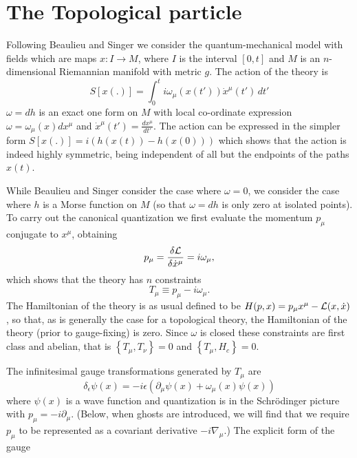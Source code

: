 \documentclass[a4paper,fleqn,12pt]{article}
\newcommand{\Intot}{\int_{0}^{t}}
\newcommand{\Omu}{\omega_{\mu}}
\newcommand{\Pmu}{p_{\mu}}
\newcommand{\Xmu}{x^{\mu}}
\newcommand{\Tmu}{T_{\mu}}
\newcommand{\Dmu}{\partial_{\mu}}
\newcommand{\DDmu}{\nabla_{\mu}}
\newcommand{\Lag}{{\cal L}}
\newcommand{\Pb}[2]{\left\{ #1,#2 \right\}}
\begin{document}
 \section{The Topological particle}
%
Following Beaulieu and Singer \cite{BeaSin} we consider the
quantum-mechanical model with fields which are maps $x: I \to M$,
where $I$ is the interval $[0,t]$ and $M$ is an $n$-dimensional
Riemannian manifold with metric $g$. The action of the theory is
 \begin{equation}\label{ACeq}
  S[x(.)] = \Intot i\Omu(x(t'))\dot{x}^{\mu}(t') \, dt'
 \end{equation}
$\omega=dh$ is an exact one form on $M$ with local co-ordinate
expression $\omega= \Omu(x) d\Xmu$ and
 $\dot{x}^{\mu}(t')= \frac{d{x}^{\mu}}{d t'}$. The action can
be expressed in the simpler form $S[x(.)] = i(h(x(t))-h(x(0)))$ which
shows that the action is indeed highly symmetric, being
independent of all but the endpoints of the paths $x(t)$.
 \par
While Beaulieu and Singer consider the case where $\omega=0$, we
consider the case where $h$ is a Morse function on $M$ (so that
$\omega=dh$ is only zero at isolated points). To carry out the
canonical quantization we first evaluate the momentum $\Pmu$
conjugate to $\Xmu$, obtaining
 \begin{equation}\label{MOMeq}
  \Pmu = \frac{\delta \Lag}{\delta \dot{x}^\mu} = i\Omu,
 \end{equation}
which shows that the theory has $n$ constraints
 \begin{equation}
   \Tmu \equiv \Pmu - i\Omu.
 \end{equation}
The Hamiltonian of the theory is as usual defined to be
 $H(p,x)= \Pmu \Xmu - \Lag(x,\dot{x})$, so that, as is generally
the case for a topological theory, the Hamiltonian of the theory
(prior to gauge-fixing) is zero. Since $\omega$ is closed these
constraints are first class and abelian, that is
$\Pb{\Tmu}{T_{\nu}}=0$ and $\Pb{\Tmu}{H_c}=0$.
 \par
The infinitesimal gauge transformations generated by $\Tmu$ are
 \begin{equation}\label{GTeq}
  \delta_{\epsilon}\psi(x) =-i \epsilon(\Dmu \psi(x) + \Omu(x) \psi(x))
 \end{equation}
where $\psi(x)$ is a wave function and  quantization is in the
Schr\"odinger picture with $\Pmu =-i \Dmu$.  (Below, when ghosts are
introduced, we will find that we require $\Pmu$ to be represented
as a covariant derivative $-i\DDmu$.) The explicit form of the gauge
\end{document}
